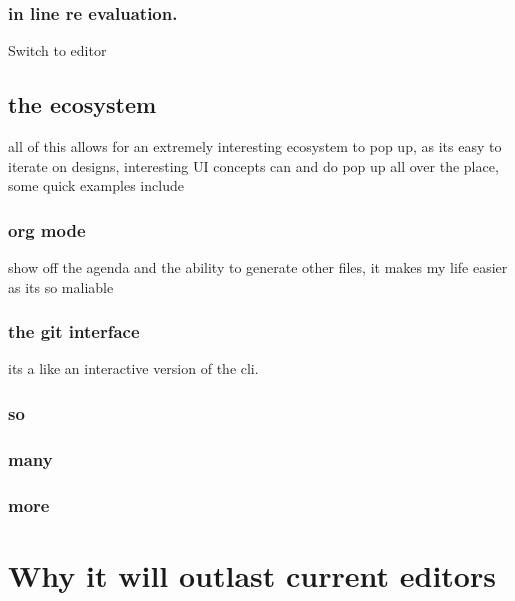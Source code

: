 \documentclass[a4paper]{article}
\begin{document}
\subsubsection*{in line re evaluation.}
\label{sec:org47fd065}
\begin{notes}
Switch to editor
\end{notes}

\subsection*{the ecosystem}
\label{sec:orgd93c88a}
\begin{notes}
all of this allows for an extremely interesting ecosystem to pop up, as its easy
to iterate on designs, interesting UI concepts can and do pop up all over the
place, some quick examples include
\end{notes}
\subsubsection*{org mode}
\label{sec:org0b7b30b}
\begin{notes}
show off the agenda and the ability to generate other files, it makes my life
easier as its so maliable
\end{notes}
\subsubsection*{the git interface}
\label{sec:org3f17afa}
\begin{notes}
its a like an interactive version of the cli.
\end{notes}
\subsubsection*{so}
\label{sec:org834d8a2}
\subsubsection*{many}
\label{sec:org98c4c21}
\subsubsection*{more}
\label{sec:org25445c9}
\section*{Why it will outlast current editors}
\label{sec:org07ed92f}
\end{document}
